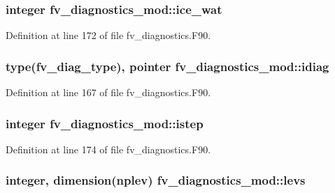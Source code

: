 \subsubsection[{ice\-\_\-wat}]{\setlength{\rightskip}{0pt plus 5cm}integer fv\-\_\-diagnostics\-\_\-mod\-::ice\-\_\-wat\hspace{0.3cm}{\ttfamily [private]}}\label{classfv__diagnostics__mod_af189fa9869405f3888a1f2134dd03f3f}


Definition at line 172 of file fv\-\_\-diagnostics.\-F90.

\subsubsection[{idiag}]{\setlength{\rightskip}{0pt plus 5cm}type(fv\-\_\-diag\-\_\-type), pointer fv\-\_\-diagnostics\-\_\-mod\-::idiag\hspace{0.3cm}{\ttfamily [private]}}\label{classfv__diagnostics__mod_ac17b875d8dec772373a51852c40f0a8a}


Definition at line 167 of file fv\-\_\-diagnostics.\-F90.

\subsubsection[{istep}]{\setlength{\rightskip}{0pt plus 5cm}integer fv\-\_\-diagnostics\-\_\-mod\-::istep\hspace{0.3cm}{\ttfamily [private]}}\label{classfv__diagnostics__mod_a78074a36a0582f24298d249ee246b208}


Definition at line 174 of file fv\-\_\-diagnostics.\-F90.

\subsubsection[{levs}]{\setlength{\rightskip}{0pt plus 5cm}integer, dimension({\bf nplev}) fv\-\_\-diagnostics\-\_\-mod\-::levs\hspace{0.3cm}{\ttfamily [private]}}\label{classfv__diagnostics__mod_a9d963f1ceb35a3b183f8106da0d9933c}


